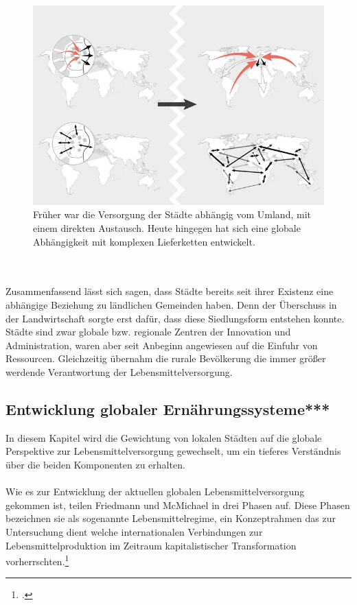 \documentclass{scrartcl}
\begin{document}
\begin{figure}[h]
\centering
\includegraphics[width=12cm]{image_folder/connections_1.jpg}
\caption{Früher war die Versorgung der Städte abhängig vom Umland, mit einem direkten Austausch. Heute hingegen hat sich eine globale Abhängigkeit mit komplexen Lieferketten entwickelt.}
\label{fig:verbindungen}
\end{figure}
\\
\\
Zusammenfassend lässt sich sagen, dass Städte bereits seit ihrer Existenz eine abhängige Beziehung zu ländlichen Gemeinden haben. Denn der Überschuss in der Landwirtschaft sorgte erst dafür, dass diese Siedlungsform entstehen konnte. Städte sind zwar globale bzw. regionale Zentren der Innovation und Administration, waren aber seit Anbeginn angewiesen auf die Einfuhr von Ressourcen. Gleichzeitig übernahm die rurale Bevölkerung die immer größer werdende Verantwortung der Lebensmittelversorgung. 

\subsection{Entwicklung globaler Ernährungssysteme***}
In diesem Kapitel wird die Gewichtung von lokalen Städten auf die globale Perspektive zur Lebensmittelversorgung gewechselt, um ein tieferes Verständnis über die beiden Komponenten zu erhalten.
\\
\\
Wie es zur Entwicklung der aktuellen globalen Lebensmittelversorgung gekommen ist, teilen Friedmann und McMichael in drei Phasen auf. Diese Phasen bezeichnen sie als sogenannte Lebensmittelregime, ein Konzeptrahmen das zur Untersuchung dient welche internationalen Verbindungen zur Lebensmittelproduktion im Zeitraum kapitalistischer Transformation vorherrschten.\footcite[Vgl.][S.95]{Friedmann1989AGRICULTUREPresent}
\end{document}
